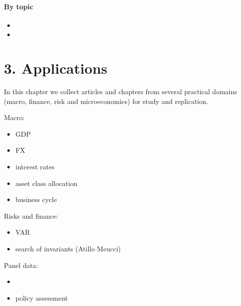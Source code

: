 \documentclass[letterpaper,10pt,english]{sphinxmanual}
\begin{document}
\subsubsection{By topic}
\label{\detokenize{history:by-topic}}\begin{itemize}
\item {} 

\item {} 

\end{itemize}


\chapter{3. Applications}
\label{\detokenize{applications::doc}}\label{\detokenize{applications:applications}}
In this chapter we collect articles and chapters from several
practical domains (macro, finance, risk and microeconomics)
for study and replication.

Macro:
\begin{itemize}
\item {} 
GDP

\item {} 
FX

\item {} 
interest rates

\item {} 
asset class allocation

\item {} 
business cycle

\end{itemize}

Risks and finance:
\begin{itemize}
\item {} 
VAR

\item {} 
search of invariants (Atillo Meucci)

\end{itemize}

Panel data:
\begin{itemize}
\item {} 

\item {} 
policy assessment

\end{itemize}
\end{document}
